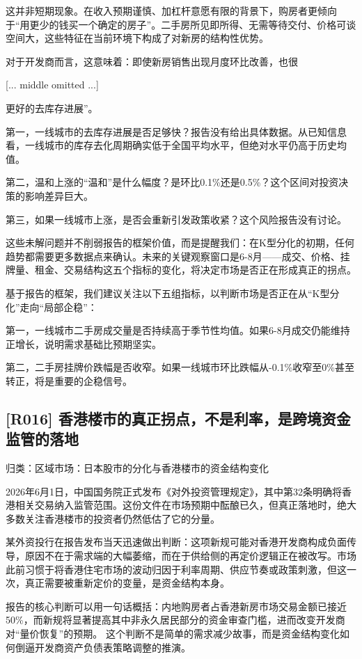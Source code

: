 \documentclass[11pt]{ctexart}
\begin{document}
这并非短期现象。在收入预期谨慎、加杠杆意愿有限的背景下，购房者更倾向于“用更少的钱买一个确定的房子”。二手房所见即所得、无需等待交付、价格可谈空间大，这些特征在当前环境下构成了对新房的结构性优势。

对于开发商而言，这意味着：即使新房销售出现月度环比改善，也很

[... middle omitted ...]

更好的去库存进展”。

第一，一线城市的去库存进展是否足够快？报告没有给出具体数据。从已知信息看，一线城市的库存去化周期确实低于全国平均水平，但绝对水平仍高于历史均值。

第二，温和上涨的“温和”是什么幅度？是环比0.1\%还是0.5\%？这个区间对投资决策的影响差异巨大。

第三，如果一线城市上涨，是否会重新引发政策收紧？这个风险报告没有讨论。

这些未解问题并不削弱报告的框架价值，而是提醒我们：在K型分化的初期，任何趋势都需要更多数据点来确认。未来的关键观察窗口是6-8月——成交、价格、挂牌量、租金、交易结构这五个指标的变化，将决定市场是否正在形成真正的拐点。

基于报告的框架，我们建议关注以下五组指标，以判断市场是否正在从“K型分化”走向“局部企稳”：

第一，一线城市二手房成交量是否持续高于季节性均值。如果6-8月成交仍能维持正增长，说明需求基础比预期坚实。

第二，二手房挂牌价跌幅是否收窄。如果一线城市环比跌幅从-0.1\%收窄至0\%甚至转正，将是重要的企稳信号。

\subsection{[R016] 香港楼市的真正拐点，不是利率，是跨境资金监管的落地}
{\small\color{refgray}归类：区域市场：日本股市的分化与香港楼市的资金结构变化}

2026年6月1日，中国国务院正式发布《对外投资管理规定》，其中第32条明确将香港相关交易纳入监管范围。这份文件在市场预期中酝酿已久，但真正落地时，绝大多数关注香港楼市的投资者仍然低估了它的分量。

某外资投行在报告发布当天迅速做出判断：这项新规可能对香港开发商构成负面传导，原因不在于需求端的大幅萎缩，而在于供给侧的再定价逻辑正在被改写。市场此前习惯于将香港住宅市场的波动归因于利率周期、供应节奏或政策刺激，但这一次，真正需要被重新定价的变量，是资金结构本身。

报告的核心判断可以用一句话概括：内地购房者占香港新房市场交易金额已接近50\%，而新规将显著提高其中非永久居民部分的资金审查门槛，进而改变开发商对“量价恢复”的预期。 这个判断不是简单的需求减少故事，而是资金结构变化如何倒逼开发商资产负债表策略调整的推演。
\end{document}
